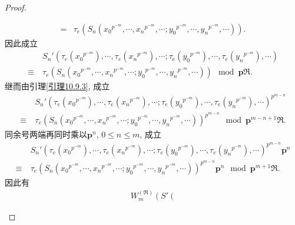\documentclass[UTF8, twoside]{ctexart}
\theoremstyle{nonumberplain}
\newtheorem{proof}{\heiti 证明}  %
\theoremstyle{nonumberplain}
\theoremstyle{plain}
\begin{document}
\begin{proof}
\begin{enumerate}
\begin{align*}
				=&{{\tau }_{e}}\left( {{S}_{n}}\left( {{x}_{0}}^{{{p}^{-m}}},\cdots ,{{x}_{n}}^{{{p}^{-m}}},\cdots;{{y}_{0}}^{{{p}^{-m}}},\cdots ,{{y}_{n}}^{{{p}^{-m}}},\cdots  \right) \right). 
			\end{align*}
			因此成立
			\begin{align*}
				& {{S}_{n}}'\left( {{\tau }_{e}}\left( {{x}_{0}}^{{{p}^{-m}}} \right),\cdots ,{{\tau }_{e}}\left( {{x}_{n}}^{{{p}^{-m}}} \right),\cdots ;{{\tau }_{e}}\left( {{y}_{0}}^{{{p}^{-m}}} \right),\cdots ,{{\tau }_{e}}\left( {{y}_{n}}^{{{p}^{-m}}} \right),\cdots  \right) \\ 
				\equiv\ & {{\tau }_{e}}\left( {{S}_{n}}\left( {{x}_{0}}^{{{p}^{-m}}},\cdots ,{{x}_{n}}^{{{p}^{-m}}},\cdots;{{y}_{0}}^{{{p}^{-m}}},\cdots ,{{y}_{n}}^{{{p}^{-m}}},\cdots  \right) \right)\ \bmod \bm{p}\Re . 
			\end{align*}
			继而由引理\ref{引理10.9.3}, 成立
			\begin{align*}
				& {{S}_{n}}'{{\left( {{\tau }_{e}}\left( {{x}_{0}}^{{{p}^{-m}}} \right),\cdots ,{{\tau }_{e}}\left( {{x}_{n}}^{{{p}^{-m}}} \right),\cdots ;{{\tau }_{e}}\left( {{y}_{0}}^{{{p}^{-m}}} \right),\cdots ,{{\tau }_{e}}\left( {{y}_{n}}^{{{p}^{-m}}} \right),\cdots  \right)}^{{{p}^{m-n}}}} \\ 
				\equiv\ & {{\tau }_{e}}{{\left( {{S}_{n}}\left( {{x}_{0}}^{{{p}^{-m}}},\cdots ,{{x}_{n}}^{{{p}^{-m}}},\cdots;{{y}_{0}}^{{{p}^{-m}}},\cdots ,{{y}_{n}}^{{{p}^{-m}}},\cdots  \right) \right)}^{{{p}^{m-n}}}}\ \bmod {\bm{p}^{m-n+1}}\Re .
			\end{align*}
			同余号两端再同时乘以${\bm{p}^{n}}$, $0\le n\le m$, 成立
			\begin{align*}
				& {{S}_{n}}'{{\left( {{\tau }_{e}}\left( {{x}_{0}}^{{{p}^{-m}}} \right),\cdots ,{{\tau }_{e}}\left( {{x}_{n}}^{{{p}^{-m}}} \right),\cdots ;{{\tau }_{e}}\left( {{y}_{0}}^{{{p}^{-m}}} \right),\cdots ,{{\tau }_{e}}\left( {{y}_{n}}^{{{p}^{-m}}} \right),\cdots  \right)}^{{{p}^{m-n}}}}{\bm{p}^{n}} \\ 
				\equiv\ & {{\tau }_{e}}{{\left( {{S}_{n}}\left( {{x}_{0}}^{{{p}^{-m}}},\cdots ,{{x}_{n}}^{{{p}^{-m}}},\cdots;{{y}_{0}}^{{{p}^{-m}}},\cdots ,{{y}_{n}}^{{{p}^{-m}}},\cdots  \right) \right)}^{{{p}^{m-n}}}}{\bm{p}^{n}}
				\ \bmod {\bm{p}^{m+1}}\Re .
			\end{align*}
			因此有
			\begin{subequations} \label{goal_2}
				\begin{align}
					& W_{m}^{\left( \Re  \right)}\left( S'\left( \begin{matrix}

\end{matrix}
\end{align}
\end{subequations}
\end{enumerate}
\end{proof}
\end{document}
